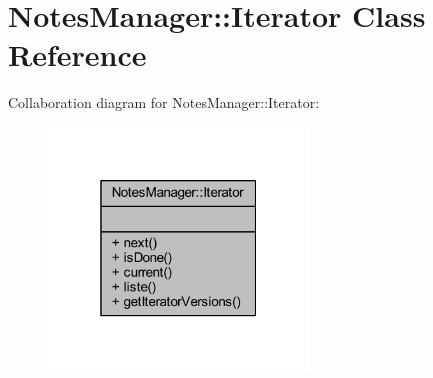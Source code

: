 \hypertarget{class_notes_manager_1_1_iterator}{}\section{Notes\+Manager\+:\+:Iterator Class Reference}
\label{class_notes_manager_1_1_iterator}


Collaboration diagram for Notes\+Manager\+:\+:Iterator\+:\nopagebreak
\begin{figure}[H]
\begin{center}
\leavevmode
\includegraphics[width=196pt]{class_notes_manager_1_1_iterator__coll__graph}
\end{center}
\end{figure}
